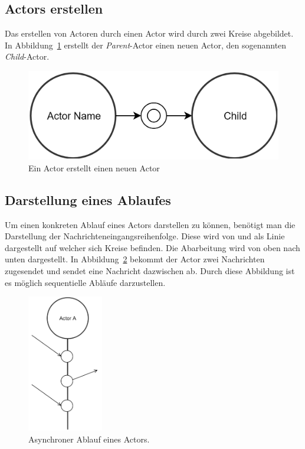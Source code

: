\subsection{Actors erstellen}
Das erstellen von Actoren durch einen Actor wird durch zwei Kreise abgebildet. In Abbildung~\ref{fig:actor:diagram:childActorCreation} erstellt der \textit{Parent}-Actor einen neuen Actor, den sogenannten \textit{Child}-Actor.
\begin{figure}
  \centering
  \includegraphics[width=.7\linewidth]{gfx/actor/childActorCreation}
  \caption{Ein Actor erstellt einen neuen Actor}
  \label{fig:actor:diagram:childActorCreation}
\end{figure}

\subsection{Darstellung eines Ablaufes}
Um einen konkreten Ablauf eines Actors darstellen zu können, benötigt man die Darstellung der Nachrichteneingangsreihenfolge. Diese wird von \cite{kuhn2017reactive} und \cite{Vernon2015ReactiveAkka} als Linie dargestellt auf welcher sich Kreise befinden. Die Abarbeitung wird von oben nach unten dargestellt. In Abbildung~\ref{fig:actor:diagram:asynchronMessageReceivment} bekommt der Actor zwei Nachrichten zugesendet und sendet eine Nachricht dazwischen ab. Durch diese Abbildung ist es möglich sequentielle Abläufe darzustellen.
\begin{figure}
  \centering
  \includegraphics[height=6cm]{gfx/actor/actorAsynchMessgeFlow}
  \caption{Asynchroner Ablauf eines Actors.}
  \label{fig:actor:diagram:asynchronMessageReceivment}
\end{figure}